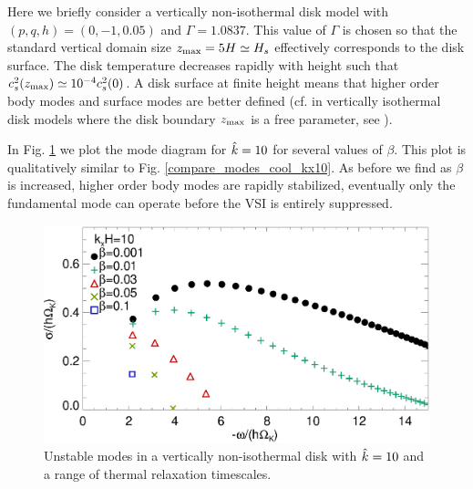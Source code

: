 
Here we briefly consider a vertically non-isothermal
disk model with $(p,q, h)=(0,-1,0.05)$ and $\Gamma=1.0837$. This
value of $\Gamma$ is chosen so that the standard vertical domain size $z_\mathrm{max} =
5H\simeq H_s$ effectively corresponds to the disk surface. The disk
temperature decreases rapidly with height such that
$c_s^2(z_\mathrm{max})\simeq 10^{-4}c_s^2(0)$. A disk surface at finite height
means that higher order body modes and surface modes are better
defined (cf. in vertically isothermal disk models where the disk
boundary $z_\mathrm{max}$ is a free parameter, see ). 


In Fig. \ref{compare_modes_vnoniso_kx10} we plot the mode diagram for
$\hat{k}=10$ for several values of $\beta$. This plot is 
qualitatively similar to Fig. \ref{compare_modes_cool_kx10}. As before
we find as $\beta$ is increased, higher order body modes are rapidly
stabilized, eventually only the fundamental mode can operate before
the VSI is entirely suppressed.  

\begin{figure}
  \includegraphics[width=\linewidth,clip=true,trim=0cm 0cm 0cm
  0cm]{figures/compare_modes_Gam1.084_kx10.ps}
  \caption{Unstable modes in a vertically non-isothermal disk with
    $\hat{k}=10$ and a range of thermal relaxation timescales.  
    \label{compare_modes_vnoniso_kx10}}
\end{figure}

